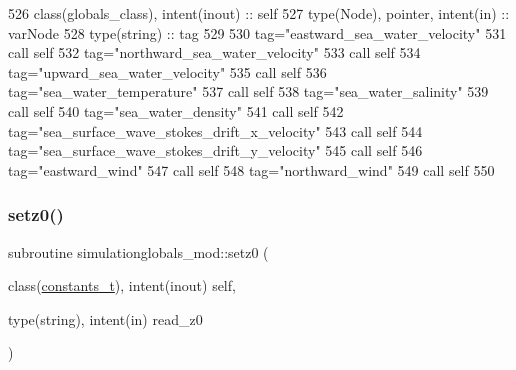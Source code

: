 \begin{DoxyCode}
526     \textcolor{keywordtype}{class}(globals\_class), \textcolor{keywordtype}{intent(inout)} :: self
527     \textcolor{keywordtype}{type}(Node), \textcolor{keywordtype}{pointer}, \textcolor{keywordtype}{intent(in)} :: varNode
528     \textcolor{keywordtype}{type}(string) :: tag
529 
530     tag=\textcolor{stringliteral}{"eastward\_sea\_water\_velocity"}
531     \textcolor{keyword}{call }self%
532     tag=\textcolor{stringliteral}{"northward\_sea\_water\_velocity"}
533     \textcolor{keyword}{call }self%
534     tag=\textcolor{stringliteral}{"upward\_sea\_water\_velocity"}
535     \textcolor{keyword}{call }self%
536     tag=\textcolor{stringliteral}{"sea\_water\_temperature"}
537     \textcolor{keyword}{call }self%
538     tag=\textcolor{stringliteral}{"sea\_water\_salinity"}
539     \textcolor{keyword}{call }self%
540     tag=\textcolor{stringliteral}{"sea\_water\_density"}
541     \textcolor{keyword}{call }self%
542     tag=\textcolor{stringliteral}{"sea\_surface\_wave\_stokes\_drift\_x\_velocity"}
543     \textcolor{keyword}{call }self%
544     tag=\textcolor{stringliteral}{"sea\_surface\_wave\_stokes\_drift\_y\_velocity"}
545     \textcolor{keyword}{call }self%
546     tag=\textcolor{stringliteral}{"eastward\_wind"}
547     \textcolor{keyword}{call }self%
548     tag=\textcolor{stringliteral}{"northward\_wind"}
549     \textcolor{keyword}{call }self%
550 
\end{DoxyCode}
\mbox{\label{namespacesimulationglobals__mod_a36c2833caae3767434115cc966fe2c5d}} 
\subsubsection{\texorpdfstring{setz0()}{setz0()}}
{\footnotesize\ttfamily subroutine simulationglobals\+\_\+mod\+::setz0 (\begin{DoxyParamCaption}\item[{class(\mbox{\hyperlink{structsimulationglobals__mod_1_1constants__t}{constants\+\_\+t}}), intent(inout)}]{self,  }\item[{type(string), intent(in)}]{read\+\_\+z0 }\end{DoxyParamCaption})\hspace{0.3cm}{\ttfamily [private]}}




